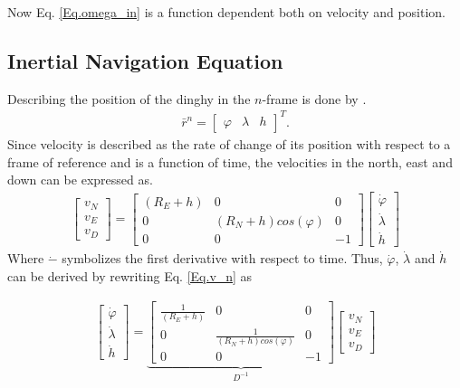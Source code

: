 \noindent Now Eq. \eqref{Eq.omega_in} is a function dependent both on velocity and position.

\subsection{Inertial Navigation Equation}
Describing the position of the dinghy in the $n$-frame is done by \cite{nonlinear}.
\begin{align}
\bar{r}^n=
\begin{bmatrix}
\varphi & \lambda & h
\end{bmatrix}^T.
\end{align}
Since velocity is described as the rate of change of its position with respect to a frame of reference and is a function of time, the velocities in the north, east and down can be expressed as.
\begin{align}
\begin{bmatrix}
v_N \\
v_E \\
v_D
\end{bmatrix}
=
\begin{bmatrix}
(R_E+h) & 0 & 0 \\
0 & (R_N+h)cos(\varphi) & 0\\
0 & 0 & -1
\end{bmatrix}
\begin{bmatrix}
\dot{\varphi}\\
\dot{\lambda}\\
\dot{h}
\end{bmatrix}
\label{Eq.v_n}
\end{align}
Where $\dot{-}$ symbolizes the first derivative with respect to time. Thus, $\dot{\varphi}$, $\dot{\lambda}$ and $\dot{h}$ can be derived by rewriting Eq. \eqref{Eq.v_n} as

\begin{align}
\begin{bmatrix}
\dot{\varphi}\\
\dot{\lambda}\\
\dot{h}
\end{bmatrix}
=
\underbrace{\begin{bmatrix}
\frac{1}{(R_E+h)} & 0 & 0 \\
0 & \frac{1}{(R_N+h)cos(\varphi)} & 0\\
0 & 0 & -1
\end{bmatrix}}_{D^{-1}}
\begin{bmatrix}
v_N \\
v_E \\
v_D
\end{bmatrix}
\label{Eq.v_n}
\end{align}

